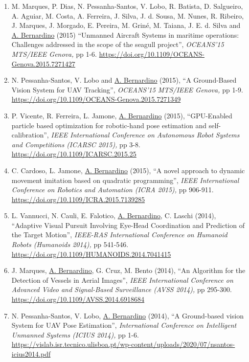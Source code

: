 \begin{enumerate}
  \url{https://doi.org/10.1007/978-3-319-20904-3_46}~
\item
  M. Marques, P. Dias, N. Pessanha-Santos, V. Lobo, R. Batista, D.
  Salgueiro, A. Aguiar, M. Costa, A. Ferreira, J. Silva, J. d. Sousa, M.
  Nunes, R. Ribeiro, J. Marques, J. Morgado, E. Pereira, M. Griné, M.
  Taiana, J. E. d. Silva and \ul{A. Bernardino} (2015) ``Unmanned
  Aircraft Systems in maritime operations: Challenges addressed in the
  scope of the seagull project'', \emph{OCEANS'15 MTS/IEEE Genova,} pp
  1-6. \url{https://doi.org/10.1109/OCEANS-Genova.2015.7271427}~
\item
  N. Pessanha-Santos, V. Lobo and \ul{A. Bernardino} (2015), ``A
  Ground-Based Vision System for UAV Tracking'', \emph{OCEANS'15
  MTS/IEEE Genova,} pp 1-9.
  \url{https://doi.org/10.1109/OCEANS-Genova.2015.7271349}~
\item
  P. Vicente, R. Ferreira, L. Jamone, \ul{A. Bernardino} (2015),
  ``GPU-Enabled particle based optimization for robotic-hand pose
  estimation and self-calibration'', \emph{IEEE International Conference
  on Autonomous Robot Systems and Competitions (ICARSC 2015),} pp 3-8.
  \url{https://doi.org/10.1109/ICARSC.2015.25}~
\item
  C. Cardoso, L. Jamone, \ul{A. Bernardino} (2015), ``A novel approach
  to dynamic movement imitation based on quadratic programming'',
  \emph{IEEE International Conference on Robotics and Automation (ICRA
  2015),} pp 906-911. \url{https://doi.org/10.1109/ICRA.2015.7139285}~
\item
  L. Vannucci, N. Cauli, E. Falotico, \ul{A. Bernardino}, C. Laschi
  (2014), ``Adaptive Visual Pursuit Involving Eye-Head Coordination and
  Prediction of the Target Motion'', \emph{IEEE-RAS International
  Conference on Humanoid Robots (Humanoids 2014),} pp 541-546.
  \url{https://doi.org/10.1109/HUMANOIDS.2014.7041415}~~~
\item
  J. Marques, \ul{A. Bernardino}, G. Cruz, M. Bento (2014), ``An
  Algorithm for the Detection of Vessels in Aerial Images'', \emph{IEEE
  International Conference on Advanced Video and Signal-Based
  Surveillance (AVSS 2014),} pp 295-300.
  \url{https://doi.org/10.1109/AVSS.2014.6918684}~
\item
  N. Pessanha-Santos, V. Lobo, \ul{A. Bernardino} (2014), ``A
  Ground-based vision System for UAV Pose Estimation'',
  \emph{International Conference on Intelligent Unmanned Systems (ICIUS
  2014),} pp 1-6.
  \url{https://vislab.isr.tecnico.ulisboa.pt/wp-content/uploads/2020/07/nsantos-icius2014.pdf}~

\end{enumerate}
